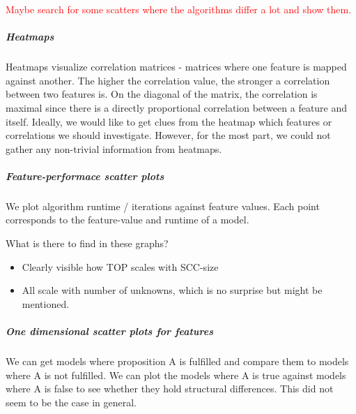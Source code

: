 \textcolor{red}{Maybe search for some scatters where the algorithms differ a lot and show them.}

\subparagraph*{Heatmaps}
Heatmaps visualize correlation matrices - matrices where one feature is mapped against another. The higher the correlation value, the stronger
a correlation between two features is. On the diagonal of the matrix, the correlation is maximal since there is a directly proportional correlation between
a feature and itself. Ideally, we would like to get clues from the heatmap which features or correlations we should investigate.
However, for the most part, we could not gather any non-trivial information from heatmaps.

\subparagraph*{Feature-performace scatter plots}
We plot algorithm runtime / iterations against feature values. Each point corresponds to the feature-value and runtime of a model.

What is there to find in these graphs?
\begin{itemize}
    \item Clearly visible how TOP scales with SCC-size
    \item All scale with number of unknowns, which is no surprise but might be mentioned.
\end{itemize}

\subparagraph*{One dimensional scatter plots for features}
We can get models where proposition A is fulfilled and compare them to models where A is not fulfilled.
We can plot the models where A is true against models where A is false to see whether they hold structural differences.
This did not seem to be the case in general.